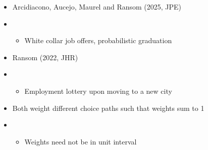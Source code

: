 \documentclass[aspectratio=169]{beamer}
\begin{document}
\begin{frame}


\begin{itemize}
\itemsep1.5em
    \item<2-> Arcidiacono, Aucejo, Maurel and Ransom (2025, JPE)
    \item<2->[]
    \begin{itemize}
    \itemsep1.5em
        \item<3-> White collar job offers, probabilistic graduation 
    \end{itemize}
    \item<4-> Ransom (2022, JHR)
    \item<4->[]
    \begin{itemize}
    \itemsep1.5em
        \item<5-> Employment lottery upon moving to a new city
    \end{itemize}
    \item<6-> Both weight different choice paths such that weights sum to 1
    \item<6->[]
    \begin{itemize}
    \itemsep1.5em
        \item<7-> Weights need not be in unit interval
    \end{itemize}
\end{itemize}

\end{frame}
\end{document}
